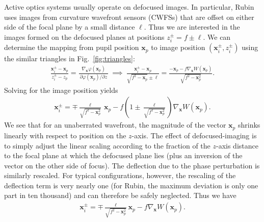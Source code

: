 \documentclass[TS,authoryear,toc]{lsstdoc}
\begin{document}
Active optics systems usually operate on defocused images.
In particular, Rubin uses images from curvature wavefront sensors (CWFSs) that are offset on either side of the focal plane by a small distance $\ell$.
Thus we are interested in the images formed on the defocused planes at positions $z_i^\pm = f \pm \ell$.
We can determine the mapping from pupil position $\mathbf{x}_p$ to image position $(\mathbf{x}_i^\pm, z_i^\pm)$ using the similar triangles in Fig.~\ref{fig:triangles}:
\begin{align}
    \frac{
        \mathbf{x}_i^\pm - \mathbf{x}_p
    }{
        z_i^\pm - z_p
    } = \frac{
        \nabla_\mathbf{x} \varphi(\mathbf{x}_p)
    }{
        ~ \partial \varphi(\mathbf{x}_p) / \partial z ~
    }
    ~ \implies ~ 
    \frac{
        \mathbf{x}_i^\pm - \mathbf{x}_p
    }{
        \sqrt{f^2 - \mathbf{x}_p} \pm \ell
    } = 
    \frac{
        - \mathbf{x}_p - f \nabla_\mathbf{x} W(\mathbf{x}_p)
    }{
        \sqrt{f^2 - \mathbf{x}_p^2}
    }.
    \label{eq:triangles}
\end{align}
Solving for the image position yields
\begin{align}
    \mathbf{x}_i^\pm = \mp \frac{\ell}{\sqrt{f^2 - \mathbf{x}_p^2}} \, \mathbf{x}_p - f \left( 1 \pm \frac{\ell}{\sqrt{f^2 - \mathbf{x}_p^2}} \right) \nabla_\mathbf{x} W(\mathbf{x}_p).
    \label{eq:map-physical-full}
\end{align}
We see that for an unaberrated wavefront, the magnitude of the vector $\mathbf{x}_p$ shrinks linearly with respect to position on the $z$-axis.
The effect of defocused-imaging is to simply adjust the linear scaling according to the fraction of the $z$-axis distance to the focal plane at which the defocused plane lies (plus an inversion of the vector on the other side of focus).
The deflection due to the phase perturbation is similarly rescaled.
For typical configurations, however, the rescaling of the deflection term is very nearly one (for Rubin, the maximum deviation is only one part in ten thousand) and can therefore be safely neglected.
Thus we have
\begin{align}
    \mathbf{x}_i^\pm = \mp \frac{\ell}{\sqrt{f^2 - \mathbf{x}_p^2}} \mathbf{x}_p - f \nabla_\mathbf{x} W(\mathbf{x}_p).
    \label{eq:map-physical}
\end{align}
\end{document}
